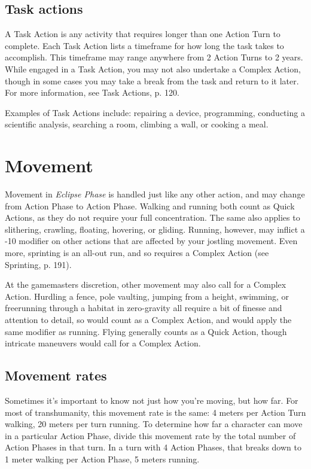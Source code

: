 \subsection{Task actions}
\label{sec:combat-task-actions}

A Task Action is any activity that requires longer than one Action Turn to complete. Each Task Action lists a timeframe for how long the task takes to accomplish. This timeframe may range anywhere from 2 Action Turns to 2 years. While engaged in a Task Action, you may not also undertake a Complex Action, though in some cases you may take a break from the task and return to it later. For more information, see Task Actions, p. 120.

Examples of Task Actions include: repairing a device, programming, conducting a scientific analysis, searching a room, climbing a wall, or cooking a meal.


\section{Movement}
\label{sec:combat-movement}

Movement in \emph{Eclipse Phase} is handled just like any other action, and may change from Action Phase to Action Phase. Walking and running both count as Quick Actions, as they do not require your full concentration. The same also applies to slithering, crawling, floating, hovering, or gliding. Running, however, may inflict a -10 modifier on other actions that are affected by your jostling movement. Even more, sprinting is an all-out run, and so requires a Complex Action (see Sprinting, p. 191).

At the gamemasters discretion, other movement may also call for a Complex Action. Hurdling a fence, pole vaulting, jumping from a height, swimming, or freerunning through a habitat in zero-gravity all require a bit of finesse and attention to detail, so would count as a Complex Action, and would apply the same modifier as running. Flying generally counts as a Quick Action, though intricate maneuvers would call for a Complex Action.


\subsection{Movement rates}
\label{sec:movement-rates}

Sometimes it’s important to know not just how you’re moving, but how far. For most of transhumanity, this movement rate is the same: 4 meters per Action Turn walking, 20 meters per turn running. To determine how far a character can move in a particular Action Phase, divide this movement rate by the total number of Action Phases in that turn. In a turn with 4 Action Phases, that breaks down to 1 meter walking per Action Phase, 5 meters running.

